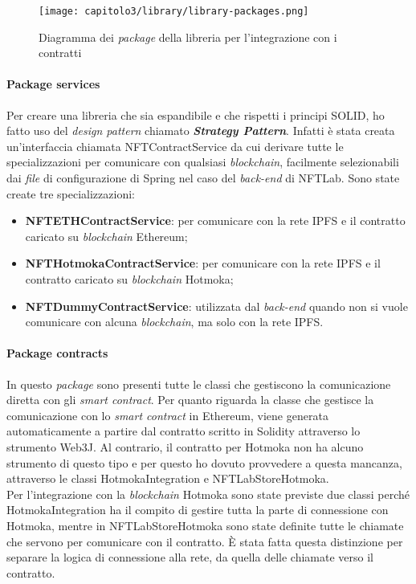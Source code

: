 \begin{figure}[h!]
  \centering
  \texttt{[image: capitolo3/library/library-packages.png]}
  \caption{Diagramma dei \textit{package} della libreria per l'integrazione con i contratti}
\end{figure}

\paragraph{Package services} Per creare una libreria che sia espandibile e che rispetti i principi SOLID, ho fatto uso del \textit{design pattern} chiamato \textit{\textbf{Strategy Pattern}}. Infatti è stata creata un'interfaccia chiamata NFTContractService da cui derivare tutte le specializzazioni per comunicare con qualsiasi \textit{blockchain}, facilmente selezionabili dai \textit{file} di configurazione di Spring nel caso del \textit{back-end} di NFTLab. Sono state create tre specializzazioni:
\begin{itemize}
  \item \textbf{NFTETHContractService}: per comunicare con la rete IPFS e il contratto caricato su \textit{blockchain} Ethereum;
  \item \textbf{NFTHotmokaContractService}: per comunicare con la rete IPFS e il contratto caricato su \textit{blockchain} Hotmoka;
  \item \textbf{NFTDummyContractService}: utilizzata dal \textit{back-end} quando non si vuole comunicare con alcuna \textit{blockchain}, ma solo con la rete IPFS.
\end{itemize}

\paragraph{Package contracts} In questo \textit{package} sono presenti tutte le classi che gestiscono la comunicazione diretta con gli \textit{smart contract}. Per quanto riguarda la classe che gestisce la comunicazione con lo \textit{smart contract} in Ethereum, viene generata automaticamente a partire dal contratto scritto in Solidity attraverso lo strumento Web3J. Al contrario, il contratto per Hotmoka non ha alcuno strumento di questo tipo e per questo ho dovuto provvedere a questa mancanza, attraverso le classi HotmokaIntegration e NFTLabStoreHotmoka. \\

Per l'integrazione con la \textit{blockchain} Hotmoka sono state previste due classi perché HotmokaIntegration ha il compito di gestire tutta la parte di connessione con Hotmoka, mentre in NFTLabStoreHotmoka sono state definite tutte le chiamate che servono per comunicare con il contratto. È stata fatta questa distinzione per separare la logica di connessione alla rete, da quella delle chiamate verso il contratto.

